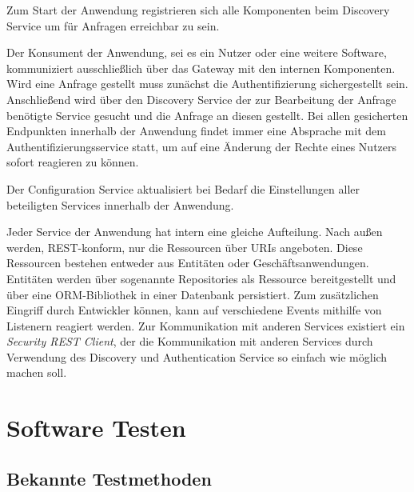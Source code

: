 \documentclass[12pt,a4paper,bibliography=totocnumbered,listof=totocnumbered]{scrartcl}
\begin{document}

Zum Start der Anwendung registrieren sich alle Komponenten beim Discovery Service um für Anfragen erreichbar zu sein.

Der Konsument der Anwendung, sei es ein Nutzer oder eine weitere Software, kommuniziert ausschließlich über das Gateway mit den internen Komponenten. Wird eine Anfrage gestellt muss zunächst die Authentifizierung sichergestellt sein. Anschließend wird über den Discovery Service der zur Bearbeitung der Anfrage benötigte Service gesucht und die Anfrage an diesen gestellt. Bei allen gesicherten Endpunkten innerhalb der Anwendung findet immer eine Absprache mit dem Authentifizierungsservice statt, um auf eine Änderung der Rechte eines Nutzers sofort reagieren zu können.

Der Configuration Service aktualisiert bei Bedarf die Einstellungen aller beteiligten Services innerhalb der Anwendung.


Jeder Service der Anwendung hat intern eine gleiche Aufteilung. Nach außen werden, REST-konform, nur die Ressourcen über \acp{URI} angeboten. Diese Ressourcen bestehen entweder aus Entitäten oder Geschäftsanwendungen. Entitäten werden über sogenannte Repositories als Ressource bereitgestellt und über eine ORM-Bibliothek in einer Datenbank persistiert. Zum zusätzlichen Eingriff durch Entwickler können, kann auf verschiedene Events mithilfe von Listenern reagiert werden. Zur Kommunikation mit anderen Services existiert ein \textit{Security REST Client}, der die Kommunikation mit anderen Services durch Verwendung des Discovery und Authentication Service so einfach wie möglich machen soll. 



\section{Software Testen}

\subsection{Bekannte Testmethoden}\label{ch:soft-test}
\end{document}
